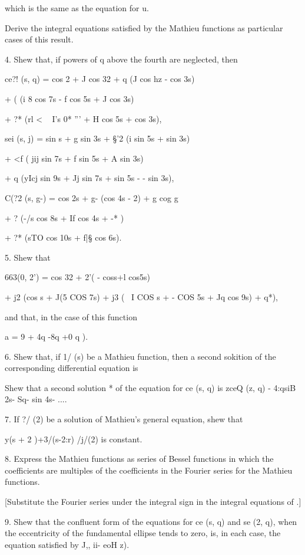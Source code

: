 {{which is the same as the equation for u.

Derive the integral equations satisfied by the Mathieu functions as
particular cases of this result.

%
%

4. Shew that, if powers of q above the fourth are neglected, then

ce?! (s, q) = cos 2 + J cos 32 + q (J cos hz - cos 3s)

+ ( (i 8 cos 7s - f cos 5s + J cos 3s)

+ ?* (rl < ~ I's 0* ''' + H cos 5s + cos 3s),

sei (s, j) = sin s + g sin 3s + §'2 (i sin 5s + sin 3s)

+ <f ( jij sin 7s + f sin 5s + A sin 3s)

+ q (yIcj sin 9s + Jj sin 7s + sin 5s - - sin 3s),

C(?2 (s, g-) = cos 2s + g- (cos 4s - 2) + g cog g

+ ? (-/s cos 8s + If cos 4s + -* )

+ ?* (sTO cos 10s + f|§ cos 6s).


5. Shew that

663(0, 2') = cos 32 + 2'( - coss+l cos5s)

+ j2 (cos s + J(5 COS 7s) + j3 ( \ I COS s + - COS 5s + Jq cos 9s) +
q*),

and that, in the case of this function

a = 9 + 4q -8q +0 q ).


6. Shew that, if 1/ (s) be a Mathieu function, then a second sokition
of the corresponding differential equation is

Shew that a second solution * of the equation for ce (s, q) is zceQ
(z, q) - 4:qsiB 2s- Sq- sin 4s- ....

7. If ?/ (2) be a solution of Mathieu's general equation, shew that

 y(s + 2 )+3/(s-2:r) /j/(2) is constant.

8. Express the Mathieu functions as series of Bessel functions in
which the coefficients are multiples of the coefficients in the
Fourier series for the Mathieu functions.

[Substitute the Fourier series under the integral sign in the integral
equations of .]

9. Shew that the confluent form of the equations for ce (s, q) and se
(2, q), when the eccentricity of the fundamental ellipse tends to
zero, is, in each case, the equation satisfied by J,, ii- eoH z).

}}
